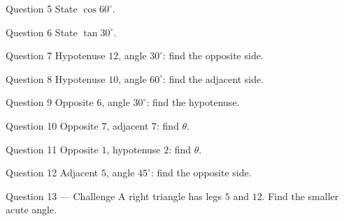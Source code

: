 \documentclass[11pt]{article}
\begin{document}
\begin{qbox}{Question 5}
State $\cos60^\circ$.\workspace{2.4cm}
\end{qbox}

\begin{qbox}{Question 6}
State $\tan30^\circ$.\workspace{2.4cm}
\end{qbox}

\begin{qbox}{Question 7}
Hypotenuse $12$, angle $30^\circ$: find the opposite side.\workspace{2.4cm}
\end{qbox}

\begin{qbox}{Question 8}
Hypotenuse $10$, angle $60^\circ$: find the adjacent side.\workspace{2.4cm}
\end{qbox}

\begin{qbox}{Question 9}
Opposite $6$, angle $30^\circ$: find the hypotenuse.\workspace{2.4cm}
\end{qbox}

\begin{qbox}{Question 10}
Opposite $7$, adjacent $7$: find $\theta$.\workspace{2.4cm}
\end{qbox}

\begin{qbox}{Question 11}
Opposite $1$, hypotenuse $2$: find $\theta$.\workspace{2.4cm}
\end{qbox}

\begin{qbox}{Question 12}
Adjacent $5$, angle $45^\circ$: find the opposite side.\workspace{2.4cm}
\end{qbox}

\begin{qbox}{Question 13 --- Challenge}
A right triangle has legs $5$ and $12$. Find the smaller acute angle.\workspace{3cm}
\end{qbox}

\clearpage
{}
\end{document}
